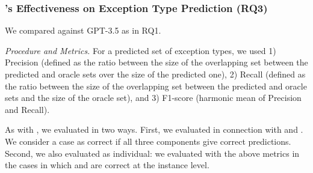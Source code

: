 \vspace{-6pt}
\subsubsection{{\xtype}'s Effectiveness on Exception Type Prediction (RQ3)}

 We compared {\xtype} against GPT-3.5 as in RQ1.






{\em Procedure and Metrics.} For a predicted set of exception types,
we used 1) Precision (defined as the ratio between the size of the
overlapping set between the predicted and oracle sets over the size of
the predicted one), 2) Recall (defined as the ratio between the size
of the overlapping set between the predicted and oracle sets and the
size of the oracle set), and 3) F1-score (harmonic mean of Precision
and Recall).

As with {\xstate}, we evaluated {\xtype} in two ways. First, we
evaluated {\xtype} in connection with {\xblock} and {\xstate}. We
consider a case as correct if all three components give correct
predictions.
Second, we also evaluated {\xtype} as individual: we evaluated
{\xtype} with the above metrics in the cases in which {\xblock} and
{\xstate} are correct at the instance level.


